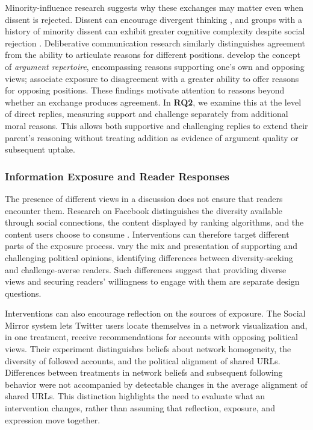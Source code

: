 Minority-influence research suggests why these exchanges may matter even
when dissent is rejected. Dissent can encourage divergent thinking
\cite{nemeth1986differential,nemeth1987divergent}, and groups with a history
of minority dissent can exhibit greater cognitive complexity despite
social rejection \cite{curseu2012socially}. Deliberative communication
research similarly distinguishes agreement from the ability to articulate
reasons for different positions. \citet{cappella2002argument} develop the
concept of \emph{argument repertoire}, encompassing reasons supporting
one's own and opposing views; \citet{price2002disagreement} associate
exposure to disagreement with a greater ability to offer reasons for
opposing positions. These findings motivate attention to reasons beyond
whether an exchange produces agreement. In \textbf{RQ2}, we examine this
at the level of direct replies, measuring support and challenge
separately from additional moral reasons. This allows both supportive and
challenging replies to extend their parent's reasoning without treating
addition as evidence of argument quality or subsequent uptake.

\subsubsection*{Information Exposure and Reader Responses}
The presence of different views in a discussion does not ensure that
readers encounter them. Research on Facebook distinguishes the diversity
available through social connections, the content displayed by ranking
algorithms, and the content users choose to consume
\cite{bakshy2015exposure}. Interventions can therefore target different
parts of the exposure process. \citet{munson2010presenting} vary the mix
and presentation of supporting and challenging political opinions,
identifying differences between diversity-seeking and challenge-averse
readers. Such differences suggest that providing diverse views and
securing readers' willingness to engage with them are separate design
questions.

Interventions can also encourage reflection on the sources of exposure.
The Social Mirror \cite{gillani2018mirror} system
lets Twitter users locate themselves in a network
visualization and, in one treatment, receive recommendations for accounts
with opposing political views. Their experiment distinguishes beliefs
about network homogeneity, the diversity of followed accounts, and the
political alignment of shared URLs. Differences between treatments in
network beliefs and subsequent following behavior were not accompanied
by detectable changes in the average alignment of shared URLs. This
distinction highlights the need to evaluate what an intervention changes,
rather than assuming that reflection, exposure, and expression move
together.

